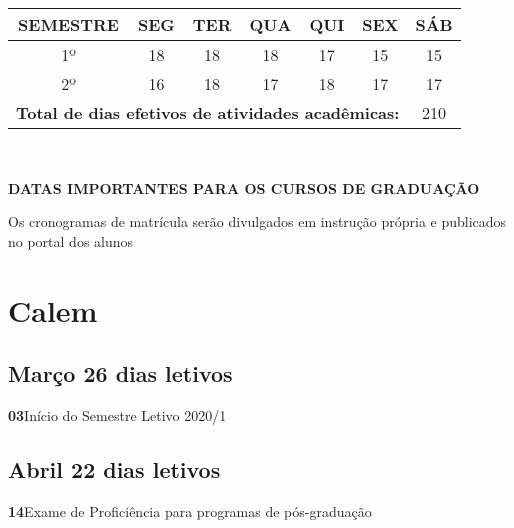 \documentclass[thesis]{hmcposter}
\begin{document}
\begin{poster}
\begin{center}
\begin{table}
{\begin{tabular}{|c|c|c|c|c|c|c|}
\hline
\textbf{SEMESTRE} & \textbf{SEG} & \textbf{TER} & \textbf{QUA} & \textbf{QUI} & \textbf{SEX} & \textbf{SÁB} \\ \hline
1º & 18 & 18 & 18 & 17 & 15 & 15 \\ \hline
2º & 16 & 18 & 17 & 18 & 17 & 17 \\ \hline
\multicolumn{6}{|c|}{\small \textbf{Total de dias efetivos de atividades acadêmicas:}}              & 210            \\ \hline
\end{tabular}
}
\end{table}
\null
\end{center}
\vfill
\null
\columnbreak
~
\vfill
\begin{center}
\large \textbf{DATAS IMPORTANTES PARA OS CURSOS DE GRADUAÇÃO}
\newline
\null
\newline
\begin{table}
\centering
{}
\end{table}
\newline
\null
\newline
Os cronogramas de matrícula serão divulgados em instrução própria e publicados no portal dos alunos
\end{center}
\vfill
\null
\newpage\section{\color{hmcorange}Calem}\subsection{Março \hfill 26 dias letivos}\textbf{03}\qquad Início do Semestre Letivo 2020/1 \newline \null\subsection{Abril \hfill 22 dias letivos}\textbf{14}\qquad Exame de Proficiência para programas de pós-graduação \newline \null\vfill\null
\columnbreak

\end{poster}
\end{document}
